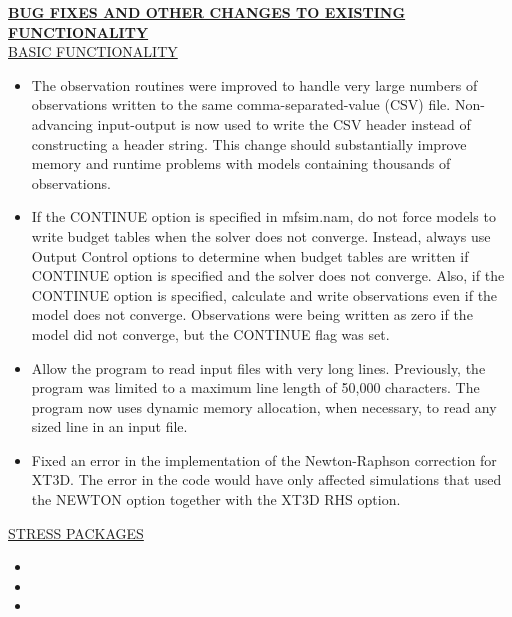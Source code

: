 \documentclass[11pt,twoside,twocolumn]{usgsreport}
\begin{document}
\begin{itemize}
	\textbf{\underline{BUG FIXES AND OTHER CHANGES TO EXISTING FUNCTIONALITY}} \\
	\underline{BASIC FUNCTIONALITY}
	\begin{itemize}
		\item The observation routines were improved to handle very large numbers of observations written to the same comma-separated-value (CSV) file.  Non-advancing input-output is now used to write the CSV header instead of constructing a header string.   This change should substantially improve memory and runtime problems with models containing thousands of observations.
		\item If the CONTINUE option is specified in mfsim.nam, do not force models to write budget tables when the solver does not converge.  Instead, always use Output Control options to determine when budget tables are written if CONTINUE option is specified and the solver does not converge.  Also, if the CONTINUE option is specified, calculate and write observations even if the model does not converge.  Observations were being written as zero if the model did not converge, but the CONTINUE flag was set.
		\item Allow the program to read input files with very long lines.  Previously, the program was limited to a maximum line length of 50,000 characters.  The program now uses dynamic memory allocation, when necessary, to read any sized line in an input file.
		\item Fixed an error in the implementation of the Newton-Raphson correction for XT3D. The error in the code would have only affected simulations that used the NEWTON option together with the XT3D RHS option. 
	\end{itemize}

	\underline{STRESS PACKAGES}
	\begin{itemize}
		\item 
		\item 
		\item 
	\end{itemize}


\end{itemize}
\end{document}
